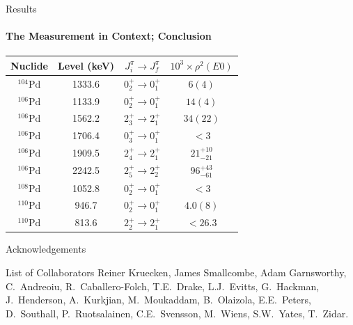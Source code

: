 \documentclass{beamer}
\begin{document}
\begin{frame}{Results}
\framesubtitle{The Measurement in Context; Conclusion}

\begin{table}[h!]
\centering
 \begin{tabular}{||c c c c||} 
 \hline
 Nuclide & Level (keV) & $J_i^\pi \rightarrow J_f^\pi$ & $10^3 \times \rho^2(E0)$ \\ [0.5ex] 
 \hline\hline
  $^{104}\mathrm{Pd}$ & 1333.6 & $0^+_2 \rightarrow 0^+_1$ & $6(4)$  \footnotemark[1] \\
\hline
 $^{106}\mathrm{Pd}$ & 1133.9 & $0^+_2 \rightarrow 0^+_1$ & $14(4)$  \footnotemark[2] \\ 
\hline
 $^{106}\mathrm{Pd}$ & 1562.2 & $2^+_3 \rightarrow 2^+_1$ & $34(22)$  \footnotemark[2] \\
\hline
 $^{106}\mathrm{Pd}$ & 1706.4 & $0^+_3 \rightarrow 0^+_1$ & $< 3$  \footnotemark[2] \\
\hline
 $^{106}\mathrm{Pd}$ & 1909.5 & $2^+_4 \rightarrow 2^+_1$ & $21^{+10}_{-21}$  \footnotemark[2] \\
\hline
  $^{106}\mathrm{Pd}$ & 2242.5 & $2^+_5 \rightarrow 2^+_2$ & $96^{+43}_{-61}$  \footnotemark[2] \\ 
\hline
  $^{108}\mathrm{Pd}$ & 1052.8 & $0^+_2 \rightarrow 0^+_1$ & $< 3$  \footnotemark[1] \\
\hline
  $^{110}\mathrm{Pd}$ & 946.7 & $0^+_2 \rightarrow 0^+_1$ & $4.0 (8)$  \footnotemark[1] \\
\hline
  $^{110}\mathrm{Pd}$ & 813.6 & $2^+_2 \rightarrow 2^+_1$ & $< 26.3$  \\ [1ex] 
 \hline
 \end{tabular}
\end{table}

\end{frame}



\begin{frame}{Acknowledgements}
  \begin{block}{List of Collaborators}
  	Reiner Kruecken\footnotemark[1], James Smallcombe\footnotemark[1], 	Adam Garnsworthy\footnotemark[1], C.~Andreoiu\footnotemark[2], R.~Caballero-Folch\footnotemark[1], T.E.~Drake\footnotemark[3], L.J.~Evitts\footnotemark[1], G.~Hackman\footnotemark[1], J.~Henderson\footnotemark[1], A.~Kurkjian\footnotemark[1], M.~Moukaddam\footnotemark[1], B.~Olaizola\footnotemark[1], E.E.~Peters\footnotemark[4], D.~Southall\footnotemark[1], P.~Ruotsalainen\footnotemark[1], C.E.~Svensson\footnotemark[5], M.~Wiens\footnotemark[1], S.W.~Yates\footnotemark[4], T.~Zidar\footnotemark[5].
  \end{block}
\end{frame}
\end{document}
